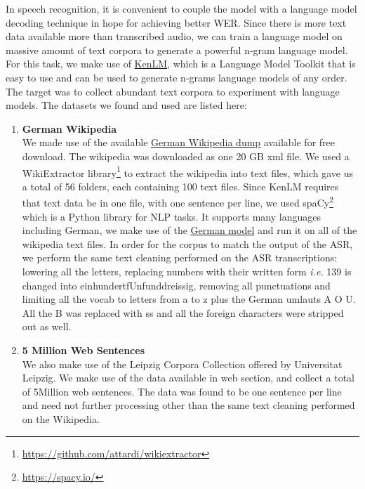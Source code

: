 In speech recognition, it is convenient to couple the model with a language model decoding technique in hope for achieving better \ac{WER}. Since there is more text data available more than transcribed audio, we can train a language model on massive amount of text corpora to generate a powerful n-gram language model. For this task, we make use of \href{https://kheafield.com/code/kenlm/}{KenLM}, which is a Language Model Toolkit that is easy to use and can be used to generate n-grams language models of any order. The target was to collect abundant text corpora to experiment with language models. The datasets we found and used are listed here:

\begin{enumerate}
	\item \textbf{German Wikipedia} \\
	We made use of the available \href{https://dumps.wikimedia.org/dewiki/latest/}{German Wikipedia dump} available for free download. The wikipedia was downloaded as one 20 GB xml file. We used a WikiExtractor library\footnote{\url{https://github.com/attardi/wikiextractor}} to extract the wikipedia into text files, which gave us a total of 56 folders, each containing 100 text files. Since KenLM requires that text data be in one file, with one sentence per line, we used spaCy\footnote{\url{https://spacy.io/}} which is a Python library for \ac{NLP} tasks. It supports many languages including German, we make use of the \href{https://spacy.io/models/de}{German model} and run it on all of the wikipedia text files. In order for the corpus to match the output of the \ac{ASR}, we perform the same text cleaning performed on the \ac{ASR} transcriptions: lowering all the letters, replacing numbers with their written form \textit{i.e.} 139 is changed into einhundertfUnfunddreissig, removing all punctuations and limiting all the vocab to letters from a to z plus the German umlauts A O U. All the B was replaced with ss and all the foreign characters were stripped out as well.
	
	
	
	\item \textbf{5 Million Web Sentences} \\
	We also make use of the Leipzig Corpora Collection offered by Universitat Leipzig. We make use of the data available in web section, and collect a total of 5Million web sentences. The data was found to be one sentence per line and need not further processing other than the same text cleaning performed on the Wikipedia.
	

\end{enumerate}
